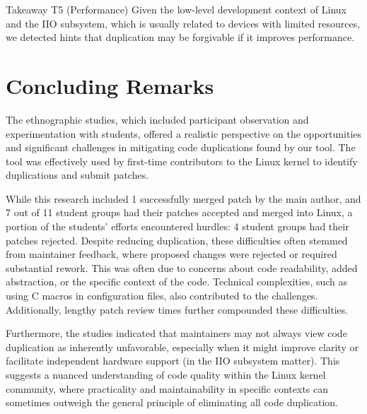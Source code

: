 \documentclass[10pt,conference]{IEEEtran}
\newenvironment{highlight-box}[1]{%
  \begin{tcolorbox}
  \textbf{#1:} \itshape}{\end{tcolorbox}}
\begin{document}
\begin{highlight-box}{Takeaway T5 (Performance)}
  Given the low-level development context of Linux and the IIO subsystem, which
  is usually related to devices with limited resources, we detected hints that
  duplication may be forgivable if it improves performance.
\end{highlight-box}

\section{Concluding Remarks}

The ethnographic studies, which included participant observation and experimentation with students, offered a realistic perspective on the opportunities and significant challenges in mitigating code duplications found by our tool. The tool was effectively used by first-time contributors to the Linux kernel to identify duplications and submit patches.

While this research included 1 successfully merged patch by the main author, and 7 out of 11 student groups had their patches accepted and merged into Linux, a portion of the students' efforts encountered hurdles: 4 student groups had their patches rejected.
Despite reducing duplication, these difficulties often stemmed from maintainer feedback, where proposed changes were rejected or required substantial rework. This was often due to concerns about code readability, added abstraction, or the specific context of the code. Technical complexities, such as using C macros in configuration files, also contributed to the challenges. Additionally, lengthy patch review times further compounded these difficulties.

Furthermore, the studies indicated that maintainers may not always view code duplication as inherently unfavorable, especially when it might improve clarity or facilitate independent hardware support (in the IIO subsystem matter). This suggests a nuanced understanding of code quality within the Linux kernel community, where practicality and maintainability in specific contexts can sometimes outweigh the general principle of eliminating all code duplication.






\end{document}
